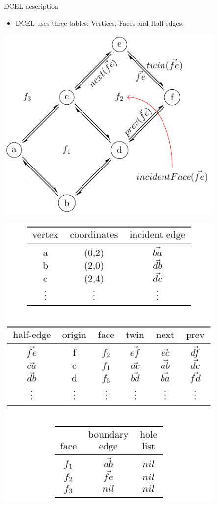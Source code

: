    \begin{frame}{DCEL description}
        \begin{itemize}
                \item DCEL uses three tables: Vertices, Faces and Half-edges.
        \end{itemize}
        \vspace{0.25cm}
        \begin{minipage}{0.49\textwidth}
            \centering
            \includegraphics[width=0.85\textwidth]{figures/dcel_representation2}
        \end{minipage}\hfill %
        \begin{minipage}{0.49\textwidth}
            \centering

            \includegraphics[width=0.85\textwidth]{figures/dcel_records}
        \end{minipage}
    \end{frame}

